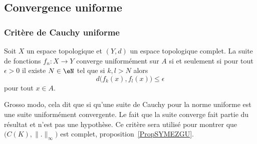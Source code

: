 \subsection{Convergence uniforme}

\subsubsection{Critère de Cauchy uniforme}


\begin{proposition}   \label{PropNTEynwq}
	Soit \( X\) un espace topologique et \( (Y,d)\) un espace topologique complet. La suite de fonctions \( f_n\colon X\to Y\) converge uniformément sur \( A\) si et seulement si pour tout \( \epsilon>0\) il existe \( N\in \eN\) tel que si \( k,l>N\) alors
	\begin{equation}
		d\big( f_k(x),f_l(x) \big)\leq \epsilon
	\end{equation}
	pour tout \( x\in A\).
\end{proposition}
Grosso modo, cela dit que si qu'une suite de Cauchy pour la norme uniforme est une suite uniformément convergente. Le fait que la suite converge fait partie du résultat et n'est pas une hypothèse. Ce critère sera utilisé pour montrer que \( \big( C(K),\| . \|_{\infty} \big)\) est complet, proposition~\ref{PropSYMEZGU}.


